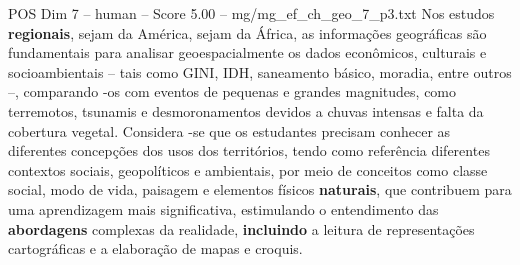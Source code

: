 \begin{textsample}{POS Dim 7 – human – Score 5.00 – mg/mg\_ef\_ch\_geo\_7\_p3.txt}  \label{ex:f7_pos_001}
Nos estudos \textbf{regionais}, sejam da América, sejam da África, as informações geográficas são fundamentais para analisar geoespacialmente os dados econômicos, culturais e socioambientais – tais como GINI, IDH, saneamento básico, moradia, entre outros –, comparando -os com eventos de pequenas e grandes magnitudes, como terremotos, tsunamis e desmoronamentos devidos a chuvas intensas e falta da cobertura vegetal.
Considera -se que os estudantes precisam conhecer as diferentes concepções dos usos dos territórios, tendo como referência diferentes contextos sociais, geopolíticos e ambientais, por meio de conceitos como classe social, modo de vida, paisagem e elementos físicos \textbf{naturais}, que contribuem para uma aprendizagem mais significativa, estimulando o entendimento das \textbf{abordagens} complexas da realidade, \textbf{incluindo} a leitura de representações cartográficas e a elaboração de mapas e croquis.

\end{textsample}
